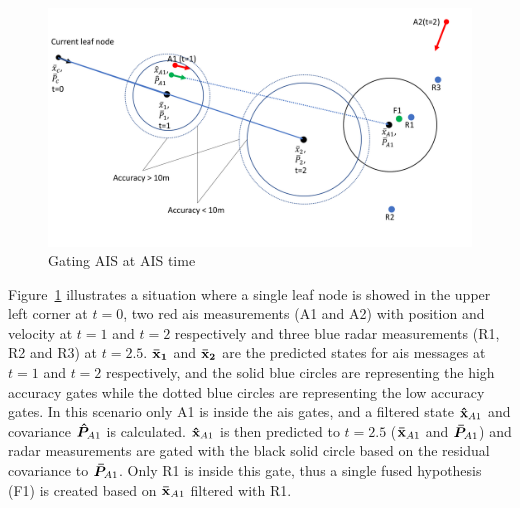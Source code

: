 \begin{figure}[H]
\centering
\includegraphics[width = .8\textwidth]{Figures/gating_at_ais_time.pdf}
\caption{Gating AIS at AIS time}\label{fig:gating_ais_at_ais_time}
\end{figure}
Figure~\ref{fig:gating_ais_at_ais_time} illustrates a situation where a single leaf node is showed in the upper left corner at \(t=0\), two red \gls{ais} measurements (A1 and A2) with position and velocity at \(t=1\) and \(t=2\) respectively and three blue radar measurements (R1, R2 and R3) at \(t=2.5\). \(\boldsymbol{\mathbf{\bar{x}_1}}\) and \(\boldsymbol{\mathbf{\bar{x}_2}}\) are the predicted states for \gls{ais} messages at \(t=1\) and \(t=2\) respectively, and the solid blue circles are representing the high accuracy gates while the dotted blue circles are representing the low accuracy gates. In this scenario only A1 is inside the \gls{ais} gates, and a filtered state \(\boldsymbol{\mathbf{\hat{x}}}_{A1}\) and covariance \(\bm{\hat{P}}_{A1}\) is calculated. \(\boldsymbol{\mathbf{\hat{x}}}_{A1}\) is then predicted to \(t=2.5\) (\(\boldsymbol{\mathbf{\bar{x}}}_{A1}\) and \(\bm{\bar{P}}_{A1}\)) and radar measurements are gated with the black solid circle based on the residual covariance to \(\bm{\bar{P}}_{A1}\). Only R1 is inside this gate, thus a single fused hypothesis (F1) is created based on \(\boldsymbol{\mathbf{\bar{x}}}_{A1}\) filtered with R1.

